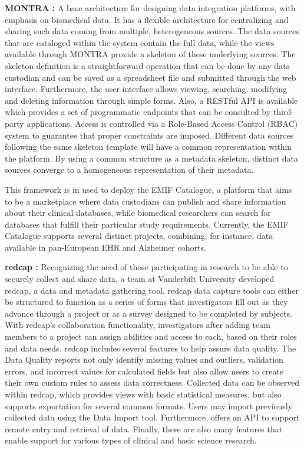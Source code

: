 \textbf{MONTRA \cite{montra}:}
A base architecture for designing data integration platforms, with emphasis on
biomedical data.
It has a flexible architecture for centralizing and sharing such data coming from
multiple, heterogeneous sources.
The data sources that are cataloged within the system contain the full data, while the
views available through MONTRA provide a skeleton of these underlying sources.
The skeleton definition is a straightforward operation that can be done by any data
custodian and can be saved as a spreadsheet file and submitted through the web
interface.
Furthermore, the user interface allows viewing, searching, modifying and deleting
information through simple forms.
Also, a RESTful API is available which provides a set of programmatic endpoints that
can be consulted by third-party applications.
Access is controlled via a Role-Based Access Control (RBAC) system to guarantee that
proper constraints are imposed.
Different data sources following the same skeleton template will have a common
representation within the platform.
By using a common structure as a metadata skeleton, distinct data sources converge to a
homogeneous representation of their metadata.

This framework is in used to deploy the EMIF Catalogue, a platform that aims to be a
marketplace where data custodians can publish and share information about their
clinical databases, while biomedical researchers can search for databases that fulfill
their particular study requirements.
Currently, the EMIF Catalogue supports several distinct projects, combining, for
instance, data available in pan-European EHR and Alzheimer cohorts.

\textbf{\gls{redcap} \cite{redcap}:}
Recognizing the need of those participating in research to be able to securely collect
and share data, a team at Vanderbilt University developed \gls{redcap}, a data and
metadata gathering tool.
\gls{redcap} data capture tools can either be structured to function as a series of
forms that investigators fill out as they advance through a project or as a survey
designed to be completed by subjects.
With \gls{redcap}'s collaboration functionality, investigators after adding team
members to a project can assign abilities and access to each, based on their roles and
data needs.
\gls{redcap} includes several features to help assure data quality.
The Data Quality reports not only identify missing values and outliers, validation
errors, and incorrect values for calculated fields but also allow users to create their
own custom rules to assess data correctness.
Collected data can be observed within \gls{redcap}, which provides views with basic
statistical measures, but also supports exportation for several common formats.
Users may import previously collected data using the Data Import tool.
Furthermore, offers an API to support remote entry and retrieval of data.
Finally, there are also many features that enable support for various types of clinical and
basic science research.

